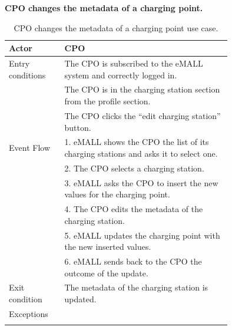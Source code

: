 \textbf{CPO changes the metadata of a charging point.}
\begin{center}
    \begin{longtable}{lp{0.75\linewidth}}
        \hline
        Actor            & CPO                                                                                 \\
        \hline
        Entry conditions & The CPO is subscribed to the eMALL system and correctly logged in.                  \\
        & The CPO is in the charging station section from the profile section.                \\
        & The CPO clicks the “edit charging station” button.                                  \\
        \hline
        Event Flow       & 1. eMALL shows the CPO the list of its charging stations and asks it to select one. \\
        & 2. The CPO selects a charging station.                                              \\
        & 3. eMALL asks the CPO to insert the new values for the charging point.              \\
        & 4. The CPO edits the metadata of the charging station.                              \\
        & 5. eMALL updates the charging point with the new inserted values.                   \\
        & 6. eMALL sends back to the CPO the outcome of the update.                           \\
        \hline
        Exit condition   & The metadata of the charging station is updated.                                    \\
        \hline
        Exceptions       &                                                                                     \\
        \hline
        \caption{CPO changes the metadata of a charging point use case.}
        \label{tab: CPO_updates_charging_point_use_case}
    \end{longtable}
\end{center}

